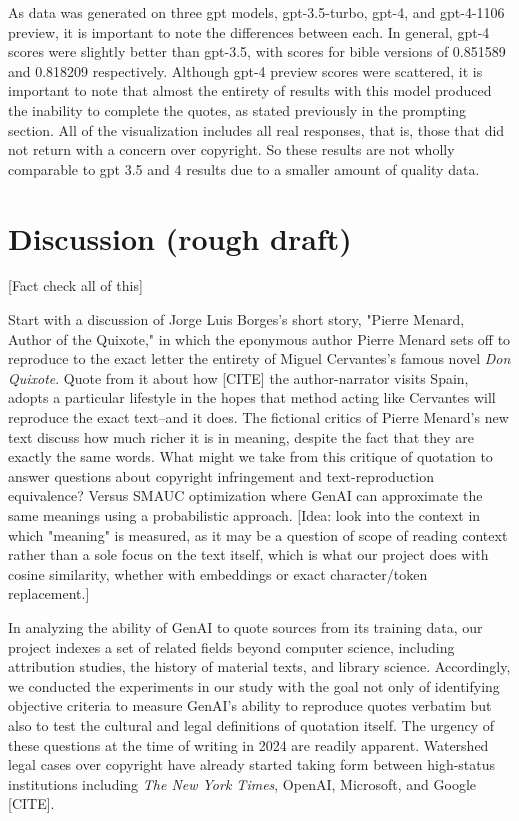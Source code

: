 \documentclass{article}
\begin{document}
As data was generated on three gpt models, gpt-3.5-turbo, gpt-4, and gpt-4-1106 preview, it is important to note the differences between each. In general, gpt-4 scores were slightly better than gpt-3.5, with scores for bible versions of 0.851589 and 0.818209 respectively. Although gpt-4 preview scores were scattered, it is important to note that almost the entirety of results with this model produced the inability to complete the quotes, as stated previously in the prompting section. All of the visualization includes all real responses, that is, those that did not return with a concern over copyright. So these results are not wholly comparable to gpt 3.5 and 4 results due to a smaller amount of quality data. 














\section{Discussion (rough draft)}
\label{sec:discussion}
[Fact check all of this]

Start with a discussion of Jorge Luis Borges's short story, "Pierre Menard, Author of the Quixote," in which the eponymous author Pierre Menard sets off to reproduce to the exact letter the entirety of Miguel Cervantes's famous novel \emph{Don Quixote}. Quote from it about how [CITE] the author-narrator visits Spain, adopts a particular lifestyle in the hopes that method acting like Cervantes will reproduce the exact text--and it does. The fictional critics of Pierre Menard's new text discuss how much richer it is in meaning, despite the fact that they are exactly the same words. What might we take from this critique of quotation to answer questions about copyright infringement and text-reproduction equivalence? Versus SMAUC optimization where GenAI can approximate the same meanings using a probabilistic approach. [Idea: look into the context in which "meaning" is measured, as it may be a question of scope of reading context rather than a sole focus on the text itself, which is what our project does with cosine similarity, whether with embeddings or exact character/token replacement.]

In analyzing the ability of GenAI to quote sources from its training data, our project indexes a set of related fields beyond computer science, including attribution studies, the history of material texts, and library science. Accordingly, we conducted the experiments in our study with the goal not only of identifying objective criteria to measure GenAI’s ability to reproduce quotes verbatim but also to test the cultural and legal definitions of quotation itself. The urgency of these questions at the time of writing in 2024 are readily apparent. Watershed legal cases over copyright have already started taking form between high-status institutions including \emph{The New York Times}, OpenAI, Microsoft, and Google [CITE]. 
\end{document}
